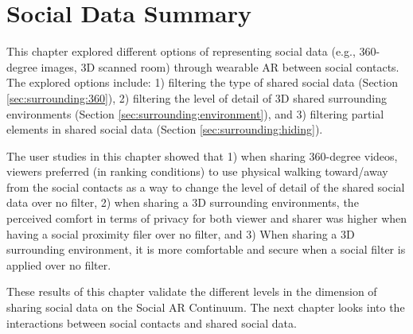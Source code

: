 \pagebreak
\section{Social Data Summary}

This chapter explored different options of representing social data (e.g., 360-degree images, 3D scanned room) through wearable AR between social contacts. The explored options include: 1) filtering the type of shared social data (Section \ref{sec:surrounding:360}), 2) filtering the level of detail of 3D shared surrounding environments (Section \ref{sec:surrounding:environment}), and 3) filtering partial elements in shared social data (Section \ref{sec:surrounding:hiding}). 

The user studies in this chapter showed that 1) when sharing 360-degree videos, viewers preferred (in ranking conditions) to use physical walking toward/away from the social contacts as a way to change the level of detail of the shared social data over no filter, 2) when sharing a 3D surrounding environments, the perceived comfort in terms of privacy for both viewer and sharer was higher when having a social proximity filer over no filter, and 3)  When sharing a 3D surrounding environment, it is more comfortable and secure when a social filter is applied over no filter.

These results of this chapter validate the different levels in the dimension of sharing social data on the Social AR Continuum. The next chapter looks into the interactions between social contacts and shared social data. 
